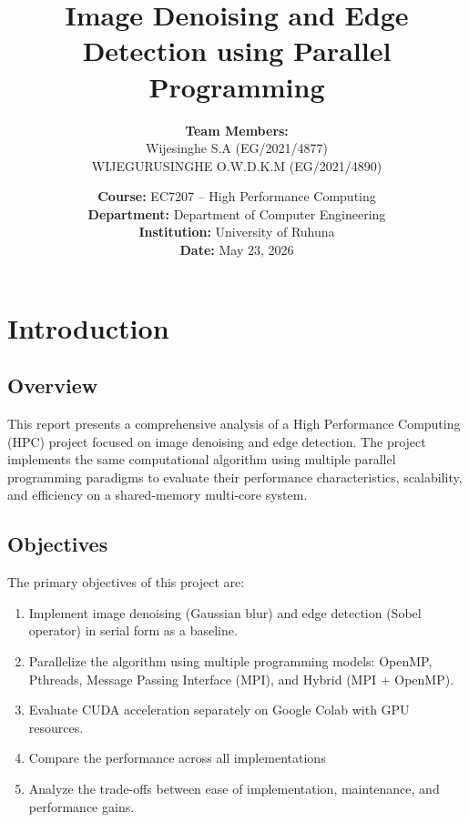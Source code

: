 \documentclass[12pt,a4paper]{report}
\title{\Huge\textbf{Image Denoising and Edge Detection using Parallel Programming}}
\author{
    \textbf{Team Members:} \\
    \large
    Wijesinghe S.A \quad (EG/2021/4877) \\
    WIJEGURUSINGHE O.W.D.K.M \quad (EG/2021/4890)
}
\date{\textbf{Course:} EC7207 -- High Performance Computing \\
      \textbf{Department:} Department of Computer Engineering \\
      \textbf{Institution:} University of Ruhuna \\
      \textbf{Date:} May 23, 2026}
\begin{document}
\maketitle

\newpage

\tableofcontents
\newpage
\chapter{Introduction}

\section{Overview}
This report presents a comprehensive analysis of a High Performance Computing (HPC) project focused on image denoising and edge detection. The project implements the same computational algorithm using multiple parallel programming paradigms to evaluate their performance characteristics, scalability, and efficiency on a shared-memory multi-core system.

\section{Objectives}
The primary objectives of this project are:
\begin{enumerate}
    \item Implement image denoising (Gaussian blur) and edge detection (Sobel operator) in serial form as a baseline.
    \item Parallelize the algorithm using multiple programming models: OpenMP, Pthreads, Message Passing Interface (MPI), and Hybrid (MPI + OpenMP).
    \item Evaluate CUDA acceleration separately on Google Colab with GPU resources.
    \item Compare the performance across all implementations
    \item Analyze the trade-offs between ease of implementation, maintenance, and performance gains.
\end{enumerate}
\end{document}
